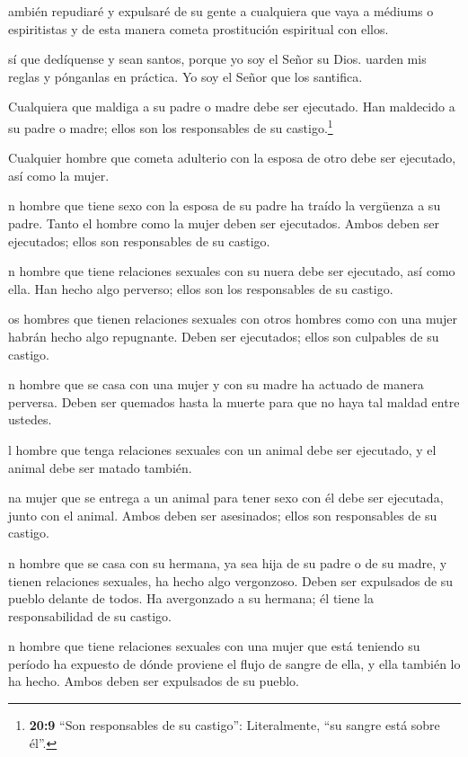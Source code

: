  ambién repudiaré y expulsaré de su gente a cualquiera que
vaya a médiums o espiritistas y de esta manera cometa prostitución
espiritual con ellos.

 sí que dedíquense y sean santos, porque yo soy el Señor su
Dios.  uarden mis reglas y pónganlas en práctica. Yo soy el
Señor que los santifica.

 Cualquiera que maldiga a su padre o madre debe ser
ejecutado. Han maldecido a su padre o madre; ellos son los responsables
de su castigo.\footnote{\textbf{20:9} ``Son responsables de su
  castigo'': Literalmente, ``su sangre está sobre él''.}

 Cualquier hombre que cometa adulterio con la esposa de
otro debe ser ejecutado, así como la mujer.

 n hombre que tiene sexo con la esposa de su padre ha
traído la vergüenza a su padre. Tanto el hombre como la mujer deben ser
ejecutados. Ambos deben ser ejecutados; ellos son responsables de su
castigo.

 n hombre que tiene relaciones sexuales con su nuera debe
ser ejecutado, así como ella. Han hecho algo perverso; ellos son los
responsables de su castigo.

 os hombres que tienen relaciones sexuales con otros
hombres como con una mujer habrán hecho algo repugnante. Deben ser
ejecutados; ellos son culpables de su castigo.

 n hombre que se casa con una mujer y con su madre ha
actuado de manera perversa. Deben ser quemados hasta la muerte para que
no haya tal maldad entre ustedes.

 l hombre que tenga relaciones sexuales con un animal debe
ser ejecutado, y el animal debe ser matado también.

 na mujer que se entrega a un animal para tener sexo con él
debe ser ejecutada, junto con el animal. Ambos deben ser asesinados;
ellos son responsables de su castigo.

 n hombre que se casa con su hermana, ya sea hija de su
padre o de su madre, y tienen relaciones sexuales, ha hecho algo
vergonzoso. Deben ser expulsados de su pueblo delante de todos. Ha
avergonzado a su hermana; él tiene la responsabilidad de su castigo.

 n hombre que tiene relaciones sexuales con una mujer que
está teniendo su período ha expuesto de dónde proviene el flujo de
sangre de ella, y ella también lo ha hecho. Ambos deben ser expulsados
de su pueblo.

